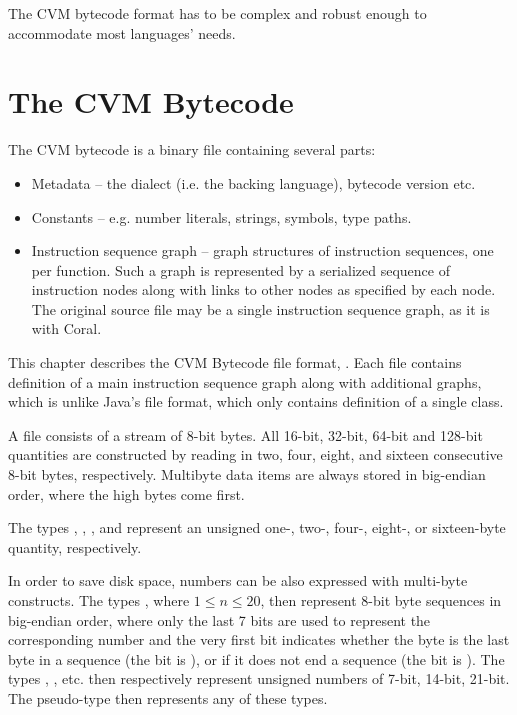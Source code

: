 The CVM bytecode format has to be complex and robust enough to accommodate most languages' needs. 





\chapter{The CVM Bytecode}






The CVM bytecode is a binary file containing several parts:

\begin{itemize}
\item Metadata -- the dialect (i.e. the backing language), bytecode version etc.
\item Constants -- e.g. number literals, strings, symbols, type paths. 
\item Instruction sequence graph -- graph structures of instruction sequences, one per function. Such a graph is represented by a serialized sequence of instruction nodes along with links to other nodes as specified by each node. The original source file may be a single instruction sequence graph, as it is with Coral. 
\end{itemize}

This chapter describes the CVM Bytecode file format, . Each  file contains definition of a main instruction sequence graph along with additional graphs, which is unlike Java's  file format, which only contains definition of a single class. 

A  file consists of a stream of 8-bit bytes. All 16-bit, 32-bit, 64-bit and 128-bit quantities are constructed by reading in two, four, eight, and sixteen consecutive 8-bit bytes, respectively. Multibyte data items are always stored in big-endian order, where the high bytes come first. 

The types , , ,  and  represent an unsigned one-, two-, four-, eight-, or sixteen-byte quantity, respectively. 

In order to save disk space, numbers can be also expressed with multi-byte constructs. The types , where $1 \leq n \leq 20$, then represent 8-bit byte sequences in big-endian order, where only the last 7 bits are used to represent the corresponding number and the very first bit indicates whether the byte is the last byte in a sequence (the bit is ), or if it does not end a sequence (the bit is ). The types , ,  etc. then respectively represent unsigned numbers of 7-bit, 14-bit, 21-bit. The pseudo-type  then represents any of these types. 


